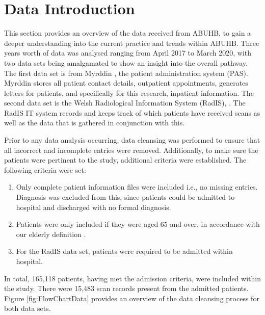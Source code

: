 \documentclass[../thesis.tex]{subfiles}
\begin{document}
\section{Data Introduction} \label{sec:dataintroduction}
This section provides an overview of the data received from ABUHB, to gain a deeper understanding into the current practice and trends within ABUHB. Three years worth of data was analysed ranging from April 2017 to March 2020, with two data sets being amalgamated to show an insight into the overall pathway. The first data set is from Myrddin \cite{WAO2018}, the patient administration system (PAS). Myrddin stores all patient contact details, outpatient appointments, generates letters for patients, and specifically for this research, inpatient information. The second data set is the Welsh Radiological Information System (RadIS), \cite{WAO2018}. The RadIS IT system records and keeps track of which patients have received scans as well as the data that is gathered in conjunction with this.

Prior to any data analysis occurring, data cleansing was performed to ensure that all incorrect and incomplete entries were removed. Additionally, to make sure the patients were pertinent to the study, additional criteria were established. The following criteria were set:
\begin{enumerate}
    \item Only complete patient information files were included i.e., no missing entries. Diagnosis was excluded from this, since patients could be admitted to hospital and discharged with no formal diagnosis.
    \item Patients were only included if they were aged 65 and over, in accordance with our elderly definition \cite{OECD}.
    \item For the RadIS data set, patients were required to be admitted within hospital.
\end{enumerate}

In total, 165,118 patients, having met the admission criteria, were included within the study. There were 15,483 scan records present from the admitted patients. Figure \ref{fig:FlowChartData} provides an overview of the data cleansing process for both data sets.
\end{document}

